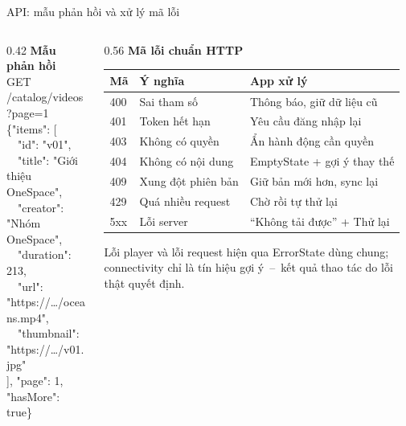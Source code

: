 \begin{frame}{API: mẫu phản hồi và xử lý mã lỗi}
\begin{columns}[T]
\begin{column}{0.42\textwidth}
{\small\textbf{Mẫu phản hồi}}\\[0.8mm]
{\tiny\ttfamily
GET /catalog/videos?page=1\\[0.5mm]
\{"items": [\\
~~"id": "v01",\\
~~"title": "Giới thiệu OneSpace",\\
~~"creator": "Nhóm OneSpace",\\
~~"duration": 213,\\
~~"url": "https://\ldots/oceans.mp4",\\
~~"thumbnail": "https://\ldots/v01.jpg"\\
], "page": 1, "hasMore": true\}}
\end{column}
\begin{column}{0.56\textwidth}
{\small\textbf{Mã lỗi chuẩn HTTP}}\\[0.8mm]
{\tiny
\begin{tabular}{@{}llp{4.4cm}@{}}
\toprule
\textbf{Mã} & \textbf{Ý nghĩa} & \textbf{App xử lý} \\
\midrule
400 & Sai tham số & Thông báo, giữ dữ liệu cũ \\
401 & Token hết hạn & Yêu cầu đăng nhập lại \\
403 & Không có quyền & Ẩn hành động cần quyền \\
404 & Không có nội dung & EmptyState + gợi ý thay thế \\
409 & Xung đột phiên bản & Giữ bản mới hơn, sync lại \\
429 & Quá nhiều request & Chờ rồi tự thử lại \\
5xx & Lỗi server & ``Không tải được'' + Thử lại \\
\bottomrule
\end{tabular}}
\vspace{1.5mm}

{\tiny\color{TextGray} Lỗi player và lỗi request hiện qua ErrorState dùng chung; connectivity chỉ là tín hiệu gợi ý~--~kết quả thao tác do lỗi thật quyết định.}
\end{column}
\end{columns}
\end{frame}

